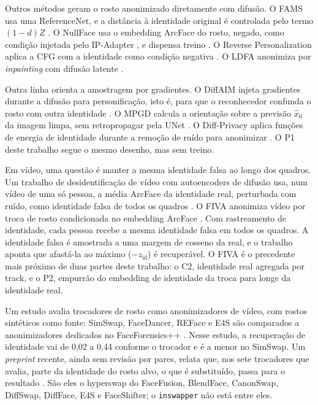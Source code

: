 Outros métodos geram o rosto anonimizado diretamente com difusão.
O FAMS usa uma ReferenceNet, e a distância à identidade original é controlada pelo termo $(1-d)Z$ \citep{kung}.
O NullFace usa o embedding ArcFace do rosto, negado, como condição injetada pelo IP-Adapter \citep{ipadapter}, e dispensa treino \citep{nullface}.
O Reverse Personalization aplica a CFG com a identidade como condição negativa \citep{revpers}.
O LDFA anonimiza por \emph{inpainting} com difusão latente \citep{klemp}.

Outra linha orienta a amostragem por gradientes.
O DiffAIM injeta gradientes durante a difusão para personificação, isto é, para que o reconhecedor confunda o rosto com outra identidade \citep{wang}.
O MPGD calcula a orientação sobre a previsão $\hat{x}_0$ da imagem limpa, sem retropropagar pela UNet \citep{mpgd}.
O Diff-Privacy aplica funções de energia de identidade durante a remoção de ruído para anonimizar \citep{diffprivacy}.
O P1 deste trabalho segue o mesmo desenho, mas sem treino.

Em vídeo, uma questão é manter a mesma identidade falsa ao longo dos quadros.
Um trabalho de desidentificação de vídeo com autoencoders de difusão usa, num vídeo de uma só pessoa, a média ArcFace da identidade real, perturbada com ruído, como identidade falsa de todos os quadros \citep{zhu-bmsb}.
O FIVA anonimiza vídeo por troca de rosto condicionada no embedding ArcFace \citep{fiva}.
Com rastreamento de identidade, cada pessoa recebe a mesma identidade falsa em todos os quadros.
A identidade falsa é amostrada a uma margem de cosseno da real, e o trabalho aponta que afastá-la ao máximo ($-z_{\mathrm{id}}$) é recuperável.
O FIVA é o precedente mais próximo de duas partes deste trabalho: o C2, identidade real agregada por track, e o P2, empurrão do embedding de identidade da troca para longe da identidade real.

Um estudo avalia trocadores de rosto como anonimizadores de vídeo, com rostos sintéticos como fonte: SimSwap, FaceDancer, REFace e E4S são comparados a anonimizadores dedicados no FaceForensics++ \citep{mustu,simswap}.
Nesse estudo, a recuperação de identidade vai de 0,02 a 0,44 conforme o trocador e é a menor no SimSwap.
Um \emph{preprint} recente, ainda sem revisão por pares, relata que, nos sete trocadores que avalia, parte da identidade do rosto alvo, o que é substituído, passa para o resultado \citep{bondalakunta}.
São eles o hyperswap do FaceFusion, BlendFace, CanonSwap, DiffSwap, DiffFace, E4S e FaceShifter; o \texttt{inswapper} não está entre eles.


